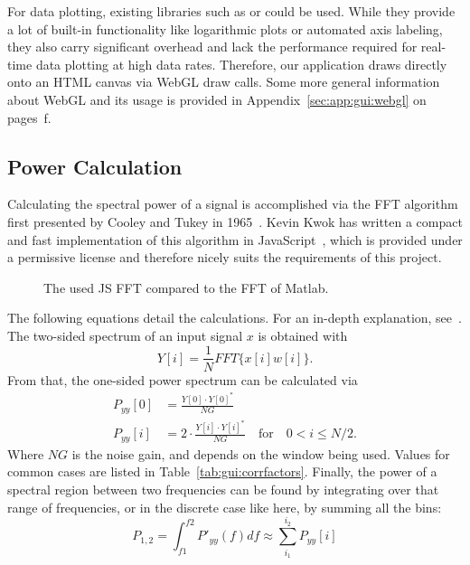 For   data  plotting,   existing   libraries  such   as     or
  could  be   used. While  they  provide  a   lot  of  built-in
functionality like  logarithmic plots  or automated  axis labeling,  they also
carry significant  overhead and  lack the  performance required  for real-time
data plotting  at high data  rates. Therefore, our application  draws directly
onto an HTML canvas via WebGL draw calls.  Some more general information about
WebGL  and  its  usage  is  provided  in  Appendix~\ref{sec:app:gui:webgl}  on
pages~\pageref{sec:app:gui:webgl}f.
%
%
\subsection{Power Calculation} %
\label{subsec:gui:power_calculation}

Calculating  the spectral  power  of  a signal  is  accomplished  via the  FFT
algorithm first presented by Cooley and Tukey in 1965~\cite{fft:cooley:tukey}.
Kevin Kwok  has written a  compact and  fast implementation of  this algorithm
in  JavaScript~\cite{kwok},  which  is  provided under  a  permissive  license
\cite{kwok:license}  and  therefore  nicely  suits the  requirements  of  this
project.

\begin{figure}
    \centering
    
    \caption[FFT comparison]{%
        The used JS FFT compared to the FFT of Matlab.%
    }
    \label{fig:gui:fft_comparison}
\end{figure}

The following equations detail  the calculations. For an in-depth explanation,
see~\cite{gui:hanspi}.   The two-sided  spectrum  of an  input  signal $x$  is
obtained with
\begin{equation}
    Y[i] = \frac{1}{N}FFT\{x[i]w[i]\}.
    \label{eq:gui:onesidedf}
\end{equation}
From that, the one-sided power spectrum can be calculated via
\begin{align}
    P_{yy}[0] &= \frac{Y[0]\cdot Y[0]^*}{NG} \nonumber\\
    P_{yy}[i] &= 2\cdot\frac{Y[i]\cdot Y[i]^*}{NG} \quad \text{for} \quad 0 < i \leq N / 2.
    \label{eq:gui:onesidedp}
\end{align}
Where $NG$ is the noise gain, and depends on the window being used. Values for
common  cases are  listed  in  Table~\ref{tab:gui:corrfactors}.  Finally,  the
power of a spectral region between two frequencies can be found by integrating
over that range of frequencies, or in  the discrete case like here, by summing
all the bins:
\begin{equation}
    P_{1,2} = \int_{f1}^{f2} P'_{yy}(f)df \approx \sum_{i_1}^{i_2}P_{yy}[i]
    \label{eq:gui:power}
\end{equation}

